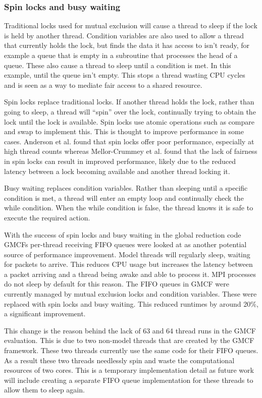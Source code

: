 \subsubsection{Spin locks and busy waiting}

Traditional locks used for mutual exclusion will cause a thread to sleep if the
lock is held by another thread. Condition variables are also used to allow a
thread that currently holds the lock, but finds the data it has access to isn't
ready, for example a queue that is empty in a subroutine that processes the head
of a queue. These also cause a thread to sleep until a condition is met. In this
example, until the queue isn't empty. This stops a thread wasting CPU cycles and
is seen as a way to mediate fair access to a shared resource.

Spin locks replace traditional locks. If another thread holds the lock, rather
than going to sleep, a thread will ``spin'' over the lock, continually trying to
obtain the lock until the lock is available. Spin locks use atomic operations
such as compare and swap to implement this. This is thought to improve
performance in some cases. Anderson et al. \cite{Anderson1990} found that spin
locks offer poor performance, especially at high thread counts whereas
Mellor-Crummey et al. \cite{Mellor-Crummey1991} found that the lack of fairness
in spin locks can result in improved performance, likely due to the reduced
latency between a lock becoming available and another thread locking it.

Busy waiting replaces condition variables. Rather than sleeping until a specific
condition is met, a thread will enter an empty loop and continually check the
while condition. When the while condition is false, the thread knows it is safe
to execute the required action.

With the success of spin locks and busy waiting in the global reduction code
GMCFs per-thread receiving FIFO queues were looked at as another potential
source of performance improvement. Model threads will regularly sleep, waiting
for packets to arrive. This reduces CPU usage but increases the latency between
a packet arriving and a thread being awake and able to process it. MPI processes
do not sleep by default for this reason. The FIFO queues in GMCF were currently
managed by mutual exclusion locks and condition variables. These were replaced
with spin locks and busy waiting. This reduced runtimes by around 20\%, a
significant improvement.

This change is the reason behind the lack of 63 and 64 thread runs in the GMCF
evaluation. This is due to two non-model threads that are created by the GMCF
framework. These two threads currently use the same code for their FIFO queues.
As a result these two threads needlessly spin and waste the computational
resources of two cores. This is a temporary implementation detail as future work
will include creating a separate FIFO queue implementation for these threads to
allow them to sleep again.

